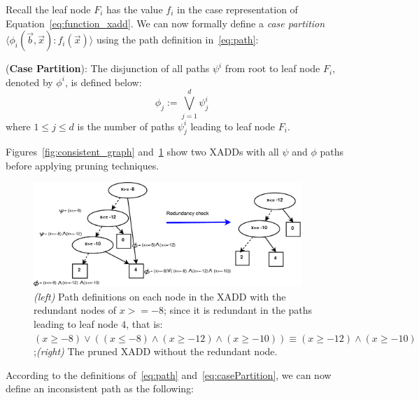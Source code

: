 \documentclass[twoside,11pt]{article}
\newenvironment{mydef}[1][Definition]{\begin{trivlist}
\item[\hskip \labelsep {\bfseries #1}]}{\end{trivlist}}
\begin{document}
Recall the leaf node $F_i$ has the value $f_i$ in the case representation of Equation~\ref{eq:function_xadd}. We can now formally define a \emph{case partition} 
$\langle \phi_i(\vec{b},\vec{x}): f_i(\vec{x})\rangle$ using the path definition in~\ref{eq:path}: 

\begin{mydef}(\textbf{Case Partition}):
The disjunction of all paths $\psi^i$ from root to leaf node $F_i$, denoted by $\phi^i$, is defined below: 
\begin{equation}
\phi_j := \bigvee_{j=1}^{d} \psi_j^{i} \label{eq:casePartition}
\end{equation} 
where $1 \leq j \leq d$ is the number of paths $\psi_j^i$ leading to leaf node $F_i$.
\end{mydef}
Figures~\ref{fig:consistent_graph} and~\ref{fig:redundant_graph} show two XADDs with all $\psi$ and $\phi$ paths before applying pruning techniques. 
\begin{figure}[t!]
\centering
\includegraphics[width=0.9\textwidth]{pics/pruningR.pdf}
\vspace{-2mm}
\caption{%
{\it (left)} Path definitions on each node in the XADD with the redundant nodes of $x>=-8$; since it is redundant in the paths leading to leaf node $4$, that is:  $(x \geq -8) \vee ((x \leq -8)\wedge(x \geq -12)\wedge(x \geq -10)) \equiv (x \geq -12)\wedge(x \geq -10)$;{\it (right)} The pruned XADD without the redundant node.}
\label{fig:redundant_graph}
\end{figure}
According to the definitions of~\ref{eq:path} and~\ref{eq:casePartition}, we can now define an inconsistent path as the following: 
\end{document}
